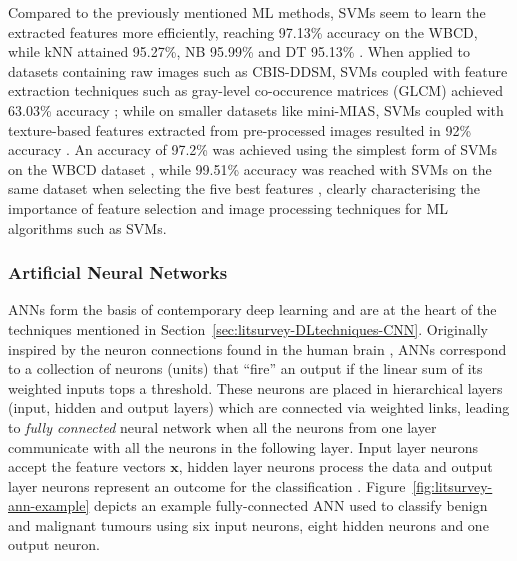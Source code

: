 Compared to the previously mentioned ML methods, SVMs seem to learn the extracted features more efficiently, reaching 97.13\% accuracy on the WBCD, while kNN attained 95.27\%, NB 95.99\% and DT 95.13\% \citep{Asri2016}. When applied to datasets containing raw images such as CBIS-DDSM, SVMs coupled with feature extraction techniques such as gray-level co-occurence matrices (GLCM) achieved 63.03\% accuracy \citep{Sarosa2018}; while on smaller datasets like  mini-MIAS, SVMs coupled with texture-based features extracted from pre-processed images resulted in 92\% accuracy \citep{Vishrutha2014}. An accuracy of 97.2\% was achieved using the simplest form of SVMs on the WBCD dataset \citep{Bennett1998}, while 99.51\% accuracy was reached with SVMs on the same dataset when selecting the five best features \citep{Akay2009}, clearly characterising the importance of feature selection and image processing techniques for ML algorithms such as SVMs.

\subsubsection{Artificial Neural Networks}
\label{sec:litsurvey-anns}

ANNs form the basis of contemporary deep learning and are at the heart of the techniques mentioned in Section~\ref{sec:litsurvey-DLtechniques-CNN}. Originally inspired by the neuron connections found in the human brain \citep{mcculloch1943logical}, ANNs correspond to a collection of neurons (units) that ``fire'' an output if the linear sum of its weighted inputs tops a threshold. These neurons are placed in hierarchical layers (input, hidden and output layers) which are connected via weighted links, leading to \textit{fully connected} neural network when all the neurons from one layer communicate with all the neurons in the following layer. Input layer neurons accept the feature vectors $\textbf{x}$, hidden layer neurons process the data and output layer neurons represent an outcome for the classification \citep{russell2002artificial}. Figure~\ref{fig:litsurvey-ann-example} depicts an example fully-connected ANN used to classify benign and malignant tumours using six input neurons, eight hidden neurons and one output neuron.\\

